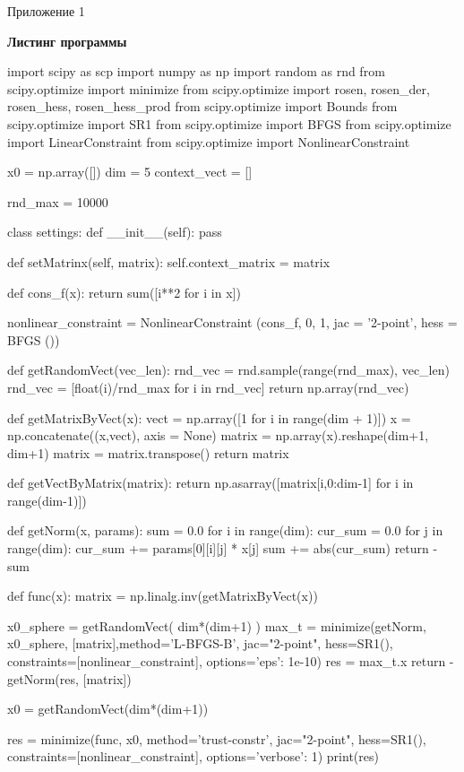 \documentclass[12pt]{article} %
\begin{document}
\begin{flushright}
	Приложение 1
\end{flushright}
\begin{center}
	{\bf Листинг программы }
\end{center}
\begin{listing}[1]{1}
import scipy as scp
import numpy as np
import random as rnd
from scipy.optimize import minimize
from scipy.optimize import rosen, rosen_der, rosen_hess, rosen_hess_prod
from scipy.optimize import Bounds
from scipy.optimize import SR1
from scipy.optimize import BFGS
from scipy.optimize import LinearConstraint
from scipy.optimize import NonlinearConstraint

x0 = np.array([])
dim = 5
context_vect = []

rnd_max = 10000

class settings:
	def __init__(self):
		pass

	def setMatrinx(self, matrix):
		self.context_matrix = matrix

def cons_f(x):
	return sum([i**2 for i in x])

nonlinear_constraint = NonlinearConstraint (cons_f, 0, 1, jac = '2-point', hess = BFGS ())   

def getRandomVect(vec_len):
	rnd_vec = rnd.sample(range(rnd_max), vec_len)
	rnd_vec = [float(i)/rnd_max for i in rnd_vec]
	return np.array(rnd_vec)

def getMatrixByVect(x):
	vect = np.array([1 for i in range(dim + 1)])
	x = np.concatenate((x,vect), axis = None)
	matrix = np.array(x).reshape(dim+1, dim+1)
	matrix = matrix.transpose()
	return matrix

def getVectByMatrix(matrix):
	return np.asarray([matrix[i,0:dim-1] for i in range(dim-1)])



def getNorm(x, params):
	sum = 0.0
	for i in range(dim):
		cur_sum = 0.0
		for j in range(dim):
			cur_sum += params[0][i][j] * x[j]
		sum += abs(cur_sum)
	return -sum

def func(x):
	matrix = np.linalg.inv(getMatrixByVect(x))

	x0_sphere = getRandomVect( dim*(dim+1) )
	max_t = minimize(getNorm, x0_sphere, [matrix],method='L-BFGS-B',  jac="2-point", hess=SR1(),
	constraints=[nonlinear_constraint], options={'eps': 1e-10})
	res = max_t.x
	return -getNorm(res, [matrix])


x0 = getRandomVect(dim*(dim+1))

res = minimize(func, x0, method='trust-constr',  jac="2-point", hess=SR1(),
	constraints=[nonlinear_constraint],
	options={'verbose': 1})
	print(res)

\end{listing}
\end{document}
